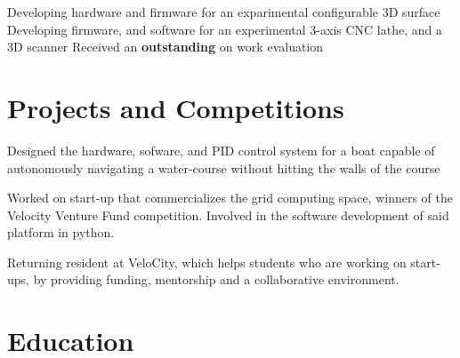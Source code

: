 \documentclass[11pt,a4paper]{moderncv}
\begin{document}
{Developing hardware and firmware for an exparimental configurable 3D surface
    \newline{}Developing firmware, and software for an experimental 3-axis CNC lathe, and a 3D scanner
\newline{}Received an \textbf{outstanding} on work evaluation}

\section{Projects and Competitions}

{Designed the hardware, sofware, and PID control system for a boat capable of autonomously navigating a water-course without hitting the walls of the course}

{Worked on start-up that commercializes the grid computing space, winners of the Velocity Venture Fund competition.
\newline{}Involved in the software development of said platform in python.}

{Returning resident at VeloCity, which helps students who are working on start-ups, by providing funding, mentorship and a collaborative environment.}

\section{Education}
\end{document}
